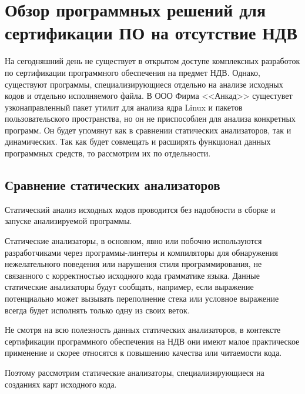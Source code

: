 \section{Обзор программных решений для сертификации ПО на отсутствие НДВ}\label{sec:ch1/sec3}
На сегодняшний день не существует в открытом доступе комплексных разработок по сертификации программного 
обеспечения на предмет НДВ. Однако, существуют программы, специализирующиеся отдельно на анализе исходных кодов
и отдельно исполняемого файла. В ООО Фирма <<Анкад>> сущестувет узконаправленный пакет утилит для анализа ядра 
Linux и пакетов пользовательского пространства, но он не приспособлен для анализа конкретных программ. Он будет 
упомянут как в сравнении статических анализаторов, так и динамических.
Так как {\ProgModule} будет совмещать и расширять функционал
данных программных средств, то рассмотрим их по отдельности.

\subsection{Сравнение статических анализаторов}\label{sec:ch1/sec3/sub1}
Статический анализ исходных кодов проводится без надобности в сборке и запуске 
анализируемой программы. 

Статические анализаторы, в основном, явно или побочно используются разработчиками через программы-линтеры и компиляторы
для обнаружения нежелательного поведения или нарушения стиля программирования, не связанного с корректностью
исходного кода грамматике языка. 
Данные статические анализаторы будут сообщать, например, если выражение потенциально
может вызывать переполнение стека или условное выражение всегда будет исполнять только одну
из своих веток.

Не смотря на всю полезность данных статических анализаторов, в контексте сертификации
программного обеспечения на НДВ они имеют малое практическое применение и
скорее относятся к повышению качества или читаемости кода.

Поэтому рассмотрим статические анализаторы, специализирующиеся на созданиях карт исходного кода.

